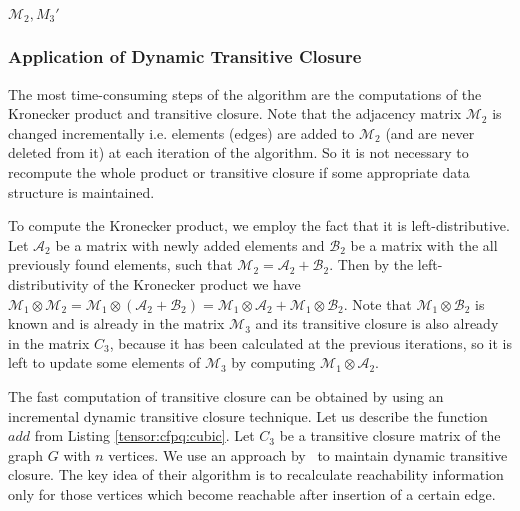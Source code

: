 \begin{algorithm}[h]
\begin{algorithmic}[1]
                \EndFor
        \EndFor
    \EndWhile
\State \Return $\mathcal{M}_2, M_3'$
\EndFunction
{}
    \State {}
\EndFunction
{}
    \State {}
\EndFunction
\end{algorithmic}
\end{algorithm}
\subsubsection{Application of Dynamic Transitive Closure}
The most time-consuming steps of the algorithm are the computations of the Kronecker product and transitive closure.
Note that the adjacency matrix $\mathcal{M}_2$ is changed incrementally i.e. elements (edges) are added to $\mathcal{M}_2$ (and are never deleted from it) at each iteration of the algorithm.
So it is not necessary to recompute the whole product or transitive closure if some appropriate data structure is maintained.

To compute the Kronecker product, we employ the fact that it is left-distributive.
Let $\mathcal{A}_2$ be a matrix with newly added elements and $\mathcal{B}_2$ be a matrix with the all previously found elements, such that $\mathcal{M}_2 = \mathcal{A}_2 + \mathcal{B}_2$.
Then by the left-distributivity of the Kronecker product we have $\mathcal{M}_1 \otimes \mathcal{M}_2 = \mathcal{M}_1 \otimes (\mathcal{A}_2 + \mathcal{B}_2) = \mathcal{M}_1\otimes \mathcal{A}_2 + \mathcal{M}_1 \otimes \mathcal{B}_2$.
Note that $\mathcal{M}_1 \otimes \mathcal{B}_2$ is known and is already in the matrix $\mathcal{M}_3$ and its transitive closure is also already in the matrix $C_3$, because it has been calculated at the previous iterations, so it is left to update some elements of $\mathcal{M}_3$ by computing $\mathcal{M}_1\otimes \mathcal{A}_2$.


The fast computation of transitive closure can be obtained by using an incremental dynamic transitive closure technique.
Let us describe the function $add$ from Listing \ref{tensor:cfpq:cubic}.
Let $C_3$ be a transitive closure matrix of the graph $G$ with $n$ vertices.
We use an approach by~\cite{IBARAKI198395} to maintain dynamic transitive closure.
The key idea of their algorithm is to recalculate reachability information only for those vertices which become reachable after insertion of a certain edge.

